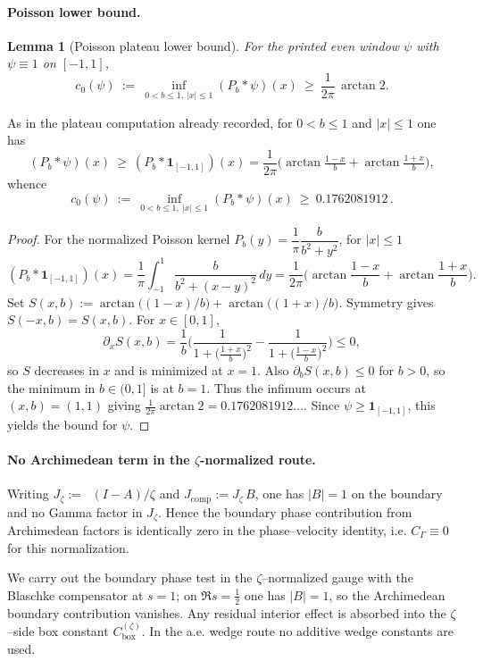 \documentclass[11pt]{article}
\newtheorem{lemma}[theorem]{Lemma}
\theoremstyle{definition}
\theoremstyle{remark}
\newcommand{\Poisson}{P}
\DeclareMathOperator{\dettwo}{det_2}
\begin{document}
\paragraph{Poisson lower bound.}
\begin{lemma}[Poisson plateau lower bound]\label{lem:poisson-plateau}
For the printed even window \(\psi\) with \(\psi\equiv 1\) on \([-1,1]\),
\[ c_0(\psi)\ :=\ \inf_{0<b\le 1,\ |x|\le 1} (\Poisson_b*\psi)(x)\ \ge\ \frac{1}{2\pi}\,\arctan 2. \]
\end{lemma}
As in the plateau computation already recorded, for \(0<b\le 1\) and \(|x|\le 1\) one has
\[
 (\Poisson_b*\psi)(x)\ \ge\ (\Poisson_b*\mathbf 1_{[-1,1]})(x)
  = \frac{1}{2\pi}\Big(\arctan\tfrac{1-x}{b}+\arctan\tfrac{1+x}{b}\Big),
\]
whence
\[
 c_0(\psi)\ :=\ \inf_{0<b\le 1,\ |x|\le 1} (\Poisson_b*\psi)(x)\ \ge\ 0.1762081912\,.
\]
\begin{proof}
For the normalized Poisson kernel \(P_b(y)=\dfrac{1}{\pi}\dfrac{b}{b^2+y^2}\), for \(|x|\le 1\)
\[
 (P_b*\mathbf 1_{[-1,1]})(x)=\frac{1}{\pi}\int_{-1}^{1}\frac{b}{b^2+(x-y)^2}\,dy=\frac{1}{2\pi}\Big(\arctan\frac{1-x}{b}+\arctan\frac{1+x}{b}\Big).
\]
Set \(S(x,b):=\arctan\big((1-x)/b\big)+\arctan\big((1+x)/b\big)\). Symmetry gives \(S(-x,b)=S(x,b)\). For \(x\in[0,1]\),
\[
 \partial_x S(x,b)=\frac{1}{b}\Big(\frac{1}{1+\big(\tfrac{1+x}{b}\big)^2}-\frac{1}{1+\big(\tfrac{1-x}{b}\big)^2}\Big)\le 0,
\]
so \(S\) decreases in \(x\) and is minimized at \(x=1\). Also \(\partial_b S(x,b)\le 0\) for \(b>0\), so the minimum in \(b\in(0,1]\) is at \(b=1\). Thus the infimum occurs at \((x,b)=(1,1)\) giving \(\frac{1}{2\pi}\arctan 2=0.1762081912\ldots\). Since \(\psi\ge \mathbf 1_{[-1,1]}\), this yields the bound for \(\psi\).
\end{proof}
\paragraph{No Archimedean term in the \(\zeta\)-normalized route.}
Writing \(J_\zeta:=\dettwo(I-A)/\zeta\) and \(J_{\mathrm{comp}}:=J_\zeta\,B\), one has \(|B|=1\) on the boundary and no Gamma factor in \(J_\zeta\). Hence the boundary phase contribution from Archimedean factors is identically zero in the phase–velocity identity, i.e. \(C_\Gamma\equiv 0\) for this normalization.

We carry out the boundary phase test in the $\zeta$–normalized gauge with the Blaschke compensator at $s=1$; on $\Re s=\tfrac12$ one has $|B|=1$, so the Archimedean boundary contribution vanishes. Any residual interior effect is absorbed into the $\zeta$–side box constant $C_{\mathrm{box}}^{(\zeta)}$. In the a.e. wedge route no additive wedge constants are used.
\end{document}

